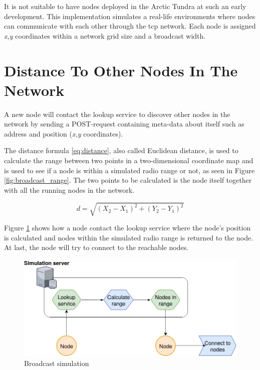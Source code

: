 \documentclass[USenglish]{uit-thesis}
\begin{document}
It is not suitable to have nodes deployed in the Arctic Tundra at such an early development. This implementation simulates a real-life environments where nodes can communicate with each other through the \gls{tcp} network. Each node is assigned \textit{x,y} coordinates within a network grid size and a broadcast width.


\section{Distance To Other Nodes In The Network}
A new node will contact the lookup service to discover other nodes in the network by sending a POST-request containing meta-data about itself such as address and position (\textit{x,y} coordinates).

The distance formula \ref{eq:distance}, also called Euclidean distance, is used to calculate the range between two points in a two-dimensional coordinate map and is used to see if a node is within a simulated radio range or not, as seen in Figure \ref{fig:broadcast_range}. The two points to be calculated is the node itself together with all the running nodes in the network.

\begin{equation} \label{eq:distance}
d = \sqrt{(X_{2} - X_{1})^{2}+(Y_{2} - Y_{1})^{2}}
\end{equation}


Figure \ref{fig:broadcast_simulation} shows how a node contact the lookup service where the node's position is calculated and nodes within the simulated radio range is returned to the node. At last, the node will try to connect to the reachable nodes.

\begin{figure} [!b]
\centering
\includegraphics[width=\textwidth]{broadcast_simulation.png}
\caption{Broadcast simulation}
\label{fig:broadcast_simulation}
\end{figure}
\end{document}

